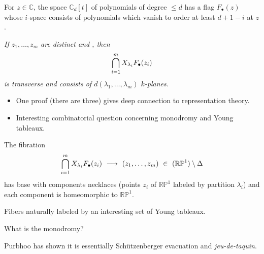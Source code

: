 \documentclass[17pt,landscape]{Narrow}
\newcommand{\DeCo}{\RoyalBlue}
\renewcommand{\P}{{\mathbb P}}
\newcommand{\C}{{\mathbb C}}
\newcommand{\R}{{\mathbb R}}
\begin{document}
\begin{flushleft}
\slide{}
\LogoOn
\begin{center}
\end{center}


For $z\in\C$, the space $\C_d[t]$ of polynomials
of degree $\leq d$ has a flag $F_\bullet(z)$ 
whose $i$-space consists of polynomials which vanish to order
at least $d{+}1{-}i$ at $z$.

\newline
{\sl 
   If $z_1,\dotsc,z_m$ are distinct and \DeCo{real}, then\vspace{-8pt}
\[
   \bigcap_{i=1}^m X_{\lambda_i}F_\bullet(z_i)\vspace{-8pt}
\]
 is transverse and consists of $d(\lambda_1,\dotsc,\lambda_m)$ \DeCo{real} $k$-planes. 
}

\begin{itemize}
\item[\Red{$\to$}] One proof (there are three) gives deep connection to representation theory.

\item[\Red{$\leadsto$}] Interesting combinatorial question concerning monodromy and Young tableaux.
\end{itemize}
\slide{}
\LogoOn
\begin{center}
\end{center}

The fibration\vspace{-8pt}
\[
    \bigcap_{i=1}^m X_{\lambda_i} F_\bullet(z_i)\  \longrightarrow\ 
      (z_1,\dotsc,z_m)\ \in\ (\R\P^1)\setminus\Delta\vspace{-8pt}
\]
has base with components necklaces (points $z_i$ of $\R\P^1$ labeled by
partition $\lambda_i$) and each component is homeomorphic to $\R\P^1$.

Fibers naturally labeled by an interesting set of Young tableaux.

  What is the monodromy?

Purbhoo has shown it is essentially Sch\"utzenberger evacuation and {\sl jeu-de-taquin}.

\end{flushleft}
\end{document}
